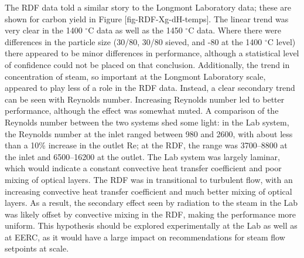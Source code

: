 \documentclass[11pt,twocolumn]{article}
\begin{document}
The RDF data told a similar story to the Longmont Laboratory data; these are shown for carbon yield in Figure [fig-RDF-Xg-dH-temps].  The linear trend was very clear in the 1400 $^{\circ}$C data as well as the 1450 $^{\circ}$C data.  Where there were differences in the particle size (30/80, 30/80 sieved, and -80 at the 1400 $^{\circ}$C level) there appeared to be minor differences in performance, although a statistical level of confidence could not be placed on that conclusion.  Additionally, the trend in concentration of steam, so important at the Longmont Laboratory scale, appeared to play less of a role in the RDF data.  Instead, a clear secondary trend can be seen with Reynolds number.  Increasing Reynolds number led to better performance, although the effect was somewhat muted.  A comparison of the Reynolds number between the two systems shed some light: in the Lab system, the Reynolds number at the inlet ranged between 980 and 2600, with about less than a 10\% increase in the outlet Re; at the RDF, the range was 3700--8800 at the inlet and 6500--16200 at the outlet.  The Lab system was largely laminar, which would indicate a constant convective heat transfer coefficient and poor mixing of optical layers.  The RDF was in transitional to turbulent flow, with an increasing convective heat transfer coefficient and much better mixing of optical layers.  As a result, the secondary effect seen by radiation to the steam in the Lab was likely offset by convective mixing in the RDF, making the performance more uniform.  This hypothesis should be explored experimentally at the Lab as well as at EERC, as it would have a large impact on recommendations for steam flow setpoints at scale.  
\end{document}
